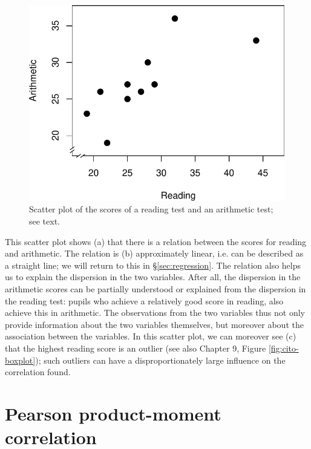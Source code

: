 \documentclass[
]{book}
\begin{document}
\begin{figure}

{\centering \includegraphics{QMS-EN_files/figure-latex/cito-scatter-1} 

}

\caption{Scatter plot of the scores of a reading test and an arithmetic test; see text.}\label{fig:cito-scatter}
\end{figure}

This scatter plot shows (a) that there is a relation between the scores
for reading and arithmetic. The relation is (b) approximately linear, i.e.
can be described as a straight line; we will return to this in
§\ref{sec:regression}.
The relation also helps us to explain the dispersion in the two
variables. After all, the dispersion in the arithmetic scores can
be partially understood or explained from the dispersion in the reading test:
pupils who achieve a relatively good score in reading, also achieve this
in arithmetic. The observations from the two variables thus not
only provide information about the two variables themselves, but moreover
about the association between the variables. In this scatter plot, we can moreover
see (c) that the highest reading score is an outlier (see also Chapter 9,
Figure \ref{fig:cito-boxplot});
such outliers can have a disproportionately
large influence on the correlation found.

\hypertarget{sec:Pearson}{%
\section{Pearson product-moment correlation}\label{sec:Pearson}}
\end{document}
